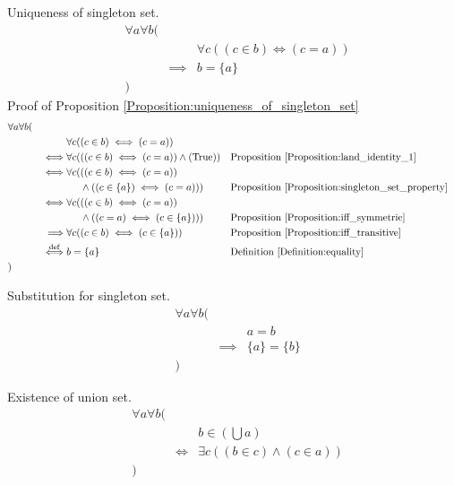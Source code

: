\begin{prop}
\label{Proposition:uniqueness_of_singleton_set}
Uniqueness of singleton set.
\begin{align*}
& \forall a \forall b ( \\
& & & \forall c ((c \in b) \iff (c = a)) \\
& & \implies & b = \{ a \} \\
& )
\end{align*}
Proof of Proposition \ref{Proposition:uniqueness_of_singleton_set}
\begin{align*}
& \forall a \forall b ( \\
& & & \forall c ((c \in b) \iff (c = a)) \\
& & \iff & \forall c (((c \in b) \iff (c = a)) \land (\text{True}))
& & \text{Proposition \ref{Proposition:land_identity_1}} \\
& & \iff & \forall c (((c \in b) \iff (c = a)) \\
& & & \phantom{\forall c (} \land ((c \in \{ a \}) \iff (c = a)))
& & \text{Proposition \ref{Proposition:singleton_set_property}} \\
& & \iff & \forall c (((c \in b) \iff (c = a)) \\
& & & \phantom{\forall c (} \land ((c = a) \iff (c \in \{ a \})))
& & \text{Proposition \ref{Proposition:iff_symmetric}} \\
& & \implies & \forall c ((c \in b) \iff (c \in \{ a \}))
& & \text{Proposition \ref{Proposition:iff_transitive}} \\
& & \overset{\operatorname{def}}{\iff} & b = \{ a \}
& & \text{Definition \ref{Definition:equality}} \\
& )
\end{align*}
\end{prop}

\begin{prop}
\label{Proposition:substitution_of_singleton_set}
Substitution for singleton set.
\begin{align*}
& \forall a \forall b ( \\
& & & a = b \\
& & \implies & \{ a \} = \{ b \} \\
& )
\end{align*}
\end{prop}

\begin{axm}
\label{Axiom:existence_of_union_set}
Existence of union set.
\begin{align*}
& \forall a \forall b ( \\
& & & b \in (\bigcup a) \\
& & \iff & \exists c ((b \in c) \land (c \in a)) \\
& )
\end{align*}
\end{axm}


